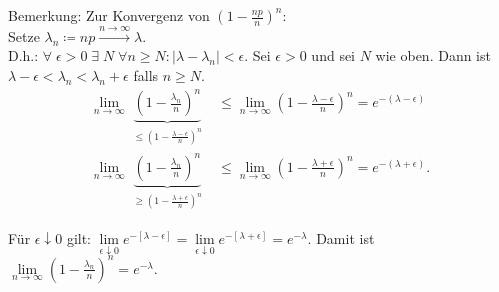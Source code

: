 \documentclass{tstextbook}
\begin{document}
\begin{remark}
	Bemerkung: Zur Konvergenz von $ \left(1-\frac{np}{n}\right)^n $: \\
	Setze $ \lambda_n \coloneqq np \overset{n\to \infty}{\longrightarrow} \lambda $. \\
	D.h.: $ \forall \; \epsilon > 0 \; \exists \; N \; \forall n \ge N: |\lambda - \lambda_n| < \epsilon $. Sei $ \epsilon > 0 $ und sei $ N $ wie oben. Dann ist $ \lambda - \epsilon < \lambda_n < \lambda_n + \epsilon $ falls $ n \ge N $.
	\[
	\begin{aligned}
		\lim\limits_{n \to \infty} \underbrace{\left( 1- \frac{\lambda_n}{n} \right)^n}_{\substack{\le \left(1-\frac{\lambda-\epsilon}{n}\right)^n}} & \le \lim\limits_{n \to \infty} \left( 1- \frac{\lambda - \epsilon}{n} \right)^n = e^{-(\lambda - \epsilon)} \\
		\lim\limits_{n \to \infty} \underbrace{\left( 1- \frac{\lambda_n}{n} \right)^n}_{\substack{\ge \left(1-\frac{\lambda+\epsilon}{n}\right)^n}} & \le \lim\limits_{n \to \infty} \left( 1- \frac{\lambda + \epsilon}{n} \right)^n = e^{-(\lambda + \epsilon)}.
	\end{aligned}
	\]
	
	Für $ \epsilon \downarrow 0 $ gilt: $ \lim\limits_{\epsilon \downarrow 0} e^{-[\lambda - \epsilon]} = \lim\limits_{\epsilon \downarrow 0} e^{-[\lambda + \epsilon]} = e^{-\lambda}$. 
	Damit ist $ \lim\limits_{n \to \infty} \left(1- \frac{\lambda_n}{n}\right)^n = e^{-\lambda} $.
\end{remark}
\end{document}
